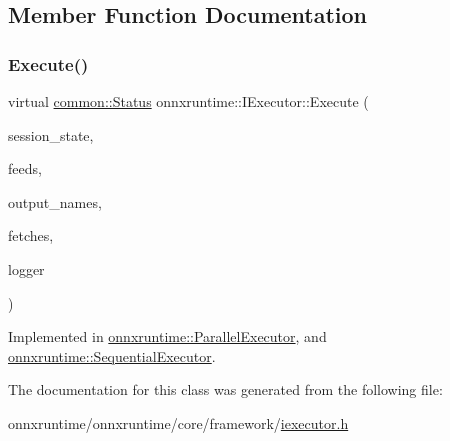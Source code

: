 \subsection{Member Function Documentation}
\mbox{\label{classonnxruntime_1_1IExecutor_a72794c9d86c407a835858c739ac4fb3e}} 
\subsubsection{\texorpdfstring{Execute()}{Execute()}}
{\footnotesize\ttfamily virtual \mbox{\hyperlink{classonnxruntime_1_1common_1_1Status}{common\+::\+Status}} onnxruntime\+::\+I\+Executor\+::\+Execute (\begin{DoxyParamCaption}\item[{const \mbox{\hyperlink{classonnxruntime_1_1SessionState}{Session\+State}} \&}]{session\+\_\+state,  }\item[{const \mbox{\hyperlink{namespaceonnxruntime_a48b01f0410ec8d693dbd40d1132bd66c}{Name\+M\+L\+Val\+Map}} \&}]{feeds,  }\item[{const std\+::vector$<$ std\+::string $>$ \&}]{output\+\_\+names,  }\item[{std\+::vector$<$ \mbox{\hyperlink{classonnxruntime_1_1MLValue}{M\+L\+Value}} $>$ \&}]{fetches,  }\item[{const \mbox{\hyperlink{classonnxruntime_1_1logging_1_1Logger}{logging\+::\+Logger}} \&}]{logger }\end{DoxyParamCaption})\hspace{0.3cm}{\ttfamily [pure virtual]}}



Implemented in \mbox{\hyperlink{classonnxruntime_1_1ParallelExecutor_acdbf9253a5e240edb49737571d321c63}{onnxruntime\+::\+Parallel\+Executor}}, and \mbox{\hyperlink{classonnxruntime_1_1SequentialExecutor_ade54efc80e70d9e2d1d5024abe40a60c}{onnxruntime\+::\+Sequential\+Executor}}.



The documentation for this class was generated from the following file\+:\begin{DoxyCompactItemize}
\item 
onnxruntime/onnxruntime/core/framework/\mbox{\hyperlink{iexecutor_8h}{iexecutor.\+h}}\end{DoxyCompactItemize}
